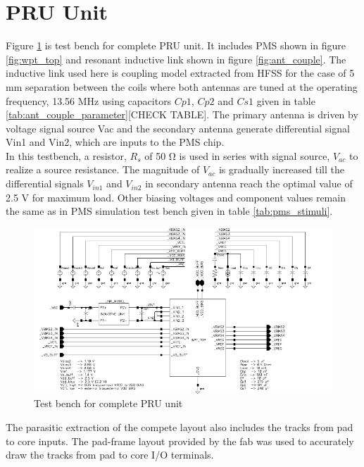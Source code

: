 \documentclass[12pt,a4paper,UKenglish]{article}
\begin{document}
\section{PRU Unit}

Figure \ref{fig:wpt_top_link} is test bench for complete PRU unit. It includes PMS shown in figure \ref{fig:wpt_top} and resonant inductive link shown in figure \ref{fig:ant_couple}. The inductive link used here is coupling model extracted from HFSS for the case of 5 mm separation between the coils where both antennas are tuned at the operating frequency, 13.56 MHz using capacitors $Cp1$, $Cp2$ and $Cs1$ given in table \ref{tab:ant_couple_parameter}[CHECK TABLE]. The primary antenna is driven by voltage signal source Vac and the secondary antenna generate differential signal Vin1 and Vin2, which are inputs to the PMS chip. \\

In this testbench, a resistor, $R_{s}$ of  50 \si{\ohm} is used in series with signal source, $V_{ac}$ to realize a source resistance. The magnitude of $V_{ac}$ is gradually increased till the differential signals $V_{in1}$ and $V_{in2}$ in secondary antenna reach the optimal value of 2.5 \si{\volt} for maximum load. Other biasing voltages and component values remain the same as in PMS simulation test bench given in table \ref{tab:pms_stimuli}. \\

\begin{figure} [H]
  \centering
  \includegraphics[width=\textwidth]{img/wpt_top_link.pdf} 
 \caption{Test bench for complete PRU unit } 
\label{fig:wpt_top_link} 
\end{figure}

The parasitic extraction of the compete layout also includes the tracks from pad to core inputs. The pad-frame layout provided by the fab was used to accurately draw the tracks from pad to core I/O terminals. \\
\end{document}
